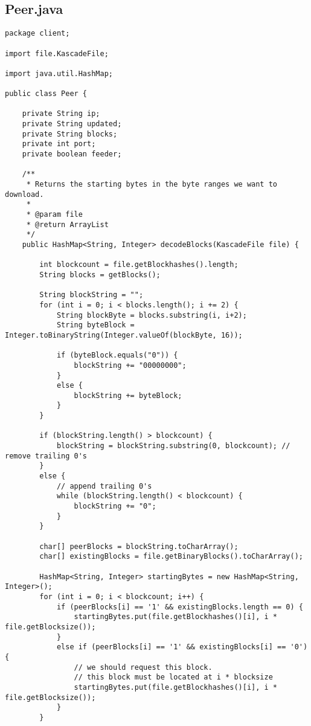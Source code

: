 \documentclass{acm_proc_article-sp}
\begin{document}
\subsection{Peer.java}
\begin{lstlisting}
package client;

import file.KascadeFile;

import java.util.HashMap;

public class Peer {

    private String ip;
    private String updated;
    private String blocks;
    private int port;
    private boolean feeder;

    /**
     * Returns the starting bytes in the byte ranges we want to download.
     *
     * @param file
     * @return ArrayList
     */
    public HashMap<String, Integer> decodeBlocks(KascadeFile file) {

        int blockcount = file.getBlockhashes().length;
        String blocks = getBlocks();

        String blockString = "";
        for (int i = 0; i < blocks.length(); i += 2) {
            String blockByte = blocks.substring(i, i+2);
            String byteBlock = Integer.toBinaryString(Integer.valueOf(blockByte, 16));

            if (byteBlock.equals("0")) {
                blockString += "00000000";
            }
            else {
                blockString += byteBlock;
            }
        }

        if (blockString.length() > blockcount) {
            blockString = blockString.substring(0, blockcount); // remove trailing 0's
        }
        else {
            // append trailing 0's
            while (blockString.length() < blockcount) {
                blockString += "0";
            }
        }

        char[] peerBlocks = blockString.toCharArray();
        char[] existingBlocks = file.getBinaryBlocks().toCharArray();

        HashMap<String, Integer> startingBytes = new HashMap<String, Integer>();
        for (int i = 0; i < blockcount; i++) {
            if (peerBlocks[i] == '1' && existingBlocks.length == 0) {
                startingBytes.put(file.getBlockhashes()[i], i * file.getBlocksize());
            }
            else if (peerBlocks[i] == '1' && existingBlocks[i] == '0') {
                // we should request this block.
                // this block must be located at i * blocksize
                startingBytes.put(file.getBlockhashes()[i], i * file.getBlocksize());
            }
        }


\end{lstlisting}
\end{document}
